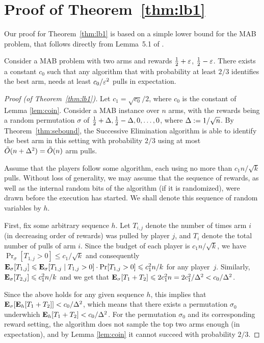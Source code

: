 \documentclass[12pt]{article}
\begin{document}
\section{Proof of Theorem~\ref{thm:lb1}}

Our proof for Theorem~\ref{thm:lb1} is based on a simple lower bound for the MAB problem, that follows directly from Lemma~5.1 of \cite{anthony1999neural}. 

\begin{lemma} \label{lem:coin}
Consider a MAB problem with two arms and rewards $\frac{1}{2} + \varepsilon$, $\frac{1}{2} - \varepsilon$.
There exists a constant $c_0$ such that any algorithm that with probability at least $2/3$ identifies the best arm, needs at least $c_0 /\varepsilon^2$ pulls in expectation.
\end{lemma}



\begin{proof}[Proof (of Theorem~\ref{thm:lb1})]
Let $c_1 = \sqrt{c_0}/2$, where $c_0$ is the constant of Lemma \ref{lem:coin}.
Consider a MAB instance over $n$ arms, with the rewards being a random
permutation $\sigma$ of $\frac{1}{2} + \Delta, \frac{1}{2} - \Delta, 0, \ldots, 0$, where $\Delta := 1/\sqrt{n}$.
By Theorem~\ref{thm:sebound}, the Successive Elimination algorithm is able to identify the best arm in this setting with probability $2/3$ using at most $\tilde{O}(n + \Delta^2) = \tilde{O}(n)$ arm pulls.

Assume that the players follow some algorithm, each using no more than $c_1 n/\sqrt{k}$ pulls. Without loss of generality, we may assume that the sequence of rewards, as well as the internal random bits of the algorithm (if it is randomized), were drawn before the execution has started. We shall denote this sequence of random variables by $h$.

First, fix some arbitrary sequence $h$. Let $T_{i,j}$ denote the number of times arm $i$ (in decreasing order of rewards) was pulled by player $j$, and $T_i$ denote the total number of pulls of arm $i$.
Since the budget of each player is $c_1 n/\sqrt{k}$, we have $\Pr_\sigma[T_{1,j} > 0] \le c_1 / \sqrt{k}$ and consequently
$
	\mathbf{E}_\sigma[T_{1,j}]
	\leqslant \mathbf{E}_\sigma[T_{1,j} \mid T_{1,j} > 0] \cdot \Pr[T_{1,j} > 0]
	\leqslant c_1^2 n/k
$
for any player~$j$.
Similarly, $\mathbf{E}_\sigma[T_{2,j}] \leqslant c_1^2 n/k$ and we get that $\mathbf{E}_\sigma[T_1 + T_2] \leqslant 2 c_1^2 n = 2 c_1^2 / \Delta^2 < c_0 / \Delta^2$.

Since the above holds for any given sequence $h$, this implies that $\mathbf{E}_\sigma[\mathbf{E}_h[T_1 + T_2]] < c_0 / \Delta^2$, which means that there exists a permutation $\sigma_0$ underwhich $\mathbf{E}_h[T_1 + T_2] < c_0 / \Delta^2$.
For the permutation $\sigma_0$ and its corresponding reward setting, the algorithm does not sample the top two arms enough (in expectation), and by Lemma \ref{lem:coin} it cannot succeed with probability $2/3$.
\end{proof}


\fi
\end{document}
